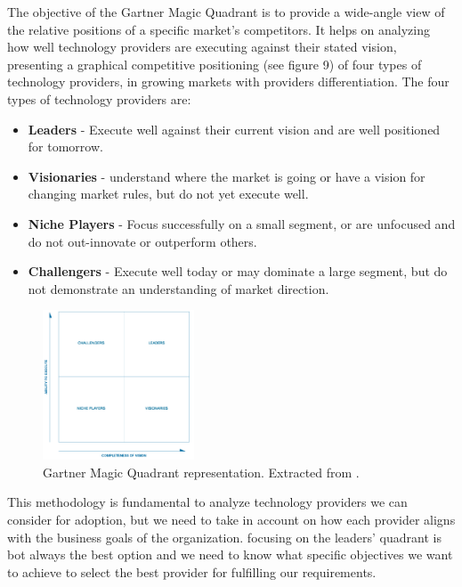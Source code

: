 The objective of the Gartner Magic Quadrant\cite{GartnerMagicQuadrant} is to provide a wide-angle view of the relative positions of a specific market's competitors. It helps on analyzing how well technology providers are executing against their stated vision, presenting a graphical competitive positioning (see figure 9) of four types of technology providers, in growing markets with providers differentiation. The four types of technology providers are:

\begin{itemize}
\item \textbf{Leaders} - Execute well against their current vision and are well positioned for tomorrow.
\item \textbf{Visionaries} - understand where the market is going or have a vision for changing market rules, but do not yet execute well.
\item \textbf{Niche Players} - Focus successfully on a small segment, or are unfocused and do not out-innovate or outperform others.
\item \textbf{Challengers} - Execute well today or may dominate a large segment, but do not demonstrate an understanding of market direction.
\end{itemize}

\begin{figure}
\centering
\includegraphics[width=0.4\textwidth]{img/GartnerMagicQuadrant.png}
\caption{Gartner Magic Quadrant representation. Extracted from \cite{GartnerMagicQuadrant}.}
\end{figure}

This methodology is fundamental to analyze technology providers we can consider for adoption, but we need to take in account on how each provider aligns with the business goals of the organization. focusing on the leaders' quadrant is bot always the best option and we need to know what specific objectives we want to achieve to select the best provider for fulfilling our requirements. 


